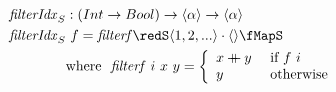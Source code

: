 \documentclass[preview]{standalone}
\begin{document}
\begin{align*}
  \mathit{filterIdx}_S &: (Int \rightarrow Bool) \rightarrow \vect{\alpha} \rightarrow \vect{\alpha} \\
  \mathit{filterIdx}_S &\ f = \mathit{filterf} \redS \vect{1,2,...} \cdot \vect{} \fMapS\\
         & \text{where}\ \ \mathit{filterf}\ i\ x\ y = 
           \left\{\begin{array}{ll}
                    x \fcat y & \text{ if } f\ i\\
                    y & \text{ otherwise}
                  \end{array}
           \right.\\
\end{align*}
\end{document}
